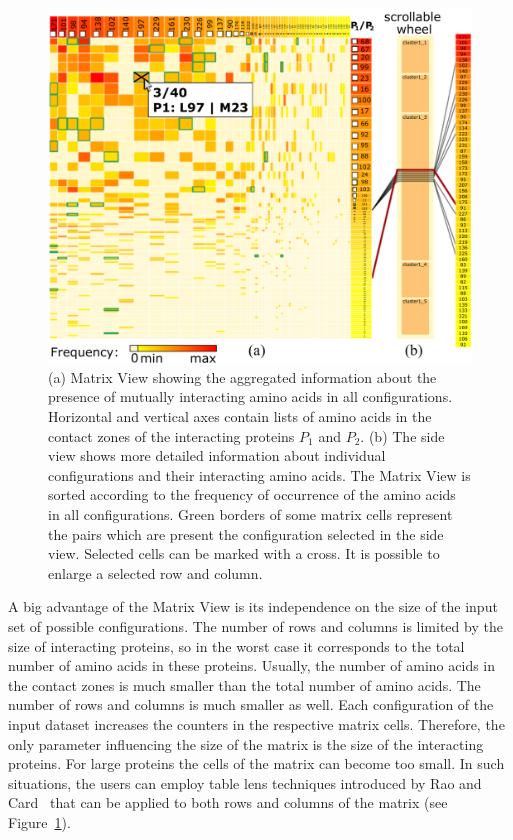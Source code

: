 \documentclass[twocolumn]{bmcart}%
\def\MatView {Matrix View\xspace}
\begin{document}
\begin{figure}[tb]
  \centering
  \includegraphics[width=0.9\columnwidth]{images/figure4.pdf}
  \caption{(a) \MatView showing the aggregated information about the presence of mutually interacting amino acids in all configurations. Horizontal and vertical axes contain lists of amino acids in the contact zones of the interacting proteins $P_1$ and $P_2$. (b) The side view shows more detailed information about individual configurations and their interacting amino acids. The \MatView is sorted according to the frequency of occurrence of the amino acids in all configurations. Green borders of some matrix cells represent the pairs which are present the configuration selected in the side view. Selected cells can be marked with a cross. It is possible to enlarge a selected row and column.}
  \label{fig:matrixlens}
\end{figure}

A big advantage of the \MatView is its independence on the size of the input set of possible configurations.
The number of rows and columns is limited by the size of interacting proteins, so in the worst case it corresponds to the total number of amino acids in these proteins.
Usually, the number of amino acids in the contact zones is much smaller than the total number of amino acids.
The number of rows and columns is much smaller as well.
Each configuration of the input dataset increases the counters in the respective matrix cells.
Therefore, the only parameter influencing the size of the matrix is the size of the interacting proteins.
For large proteins the cells of the matrix can become too small.
In such situations, the users can employ table lens techniques introduced by Rao and Card~\cite{Rao1994} that can be applied to both rows and columns of the matrix (see Figure~\ref{fig:matrixlens}).
\end{document}
